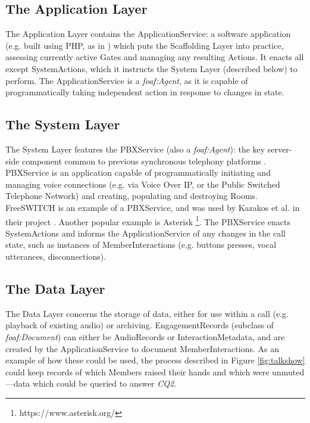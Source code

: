 \subsection{The Application Layer}

The Application Layer contains the ApplicationService: a software application (e.g. built using PHP, as in  \cite{Kazakos2016}) which puts the Scaffolding Layer into practice, assessing currently active Gates and managing any resulting Actions. It enacts all except SystemActions, which it instructs the System Layer (described below) to perform. The ApplicationService is a \textit{foaf:Agent}, as it is capable of programmatically taking independent action in response to changes in state.

\subsection{The System Layer}

The System Layer features the PBXService (also a \textit{foaf:Agent}): the key server-side component common to previous synchronous telephony platforms \cite{Kazakos2016, Talhouk2017, Yadav2017}. PBXService is an application capable of programmatically initiating and managing voice connections (e.g. via Voice Over IP, or the Public Switched Telephone Network) and creating, populating and destroying Rooms. FreeSWITCH is an example of a PBXService, and was used by Kazakos et al. in their project \cite{Kazakos2016}. Another popular example is Asterisk \footnote{https://www.asterisk.org/}. The PBXService enacts SystemActions and informs the ApplicationService of any changes in the call state, such as instances of MemberInteractions (e.g. buttons presses, vocal utterances, disconnections).

\subsection{The Data Layer}

The Data Layer concerns the storage of data, either for use within a call (e.g. playback of existing audio) or archiving. EngagementRecords (subclass of \textit{foaf:Document}) can either be AudioRecords or InteractionMetadata, and are created by the ApplicationService to document MemberInteractions. As an example of how these could be used, the process described in Figure \ref{fig:talkshow} could keep records of which Members raised their hands and which were unmuted---data which could be queried to answer \textit{CQ2}.